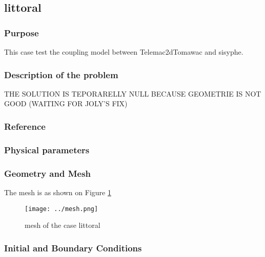\subsection{littoral}
%

%
\subsubsection{Purpose}
%
This case test the coupling model between Telemac2dTomawac and sisyphe. 
%
\subsubsection{Description of the problem}
%
THE SOLUTION IS TEPORARELLY NULL BECAUSE GEOMETRIE IS NOT GOOD (WAITING FOR JOLY'S FIX)
%
%
\subsubsection{Reference}
%

%
%
\subsubsection{Physical parameters}
%

%
%
\subsubsection{Geometry and Mesh}
%
The mesh is as shown on Figure \ref{littoralmesh}
\begin{figure} [!h]
\centering
\texttt{[image: ../mesh.png]}
 \caption{mesh of the case littoral}
\label{littoralmesh}
\end{figure}

%
%
\subsubsection{Initial and Boundary Conditions}
%

